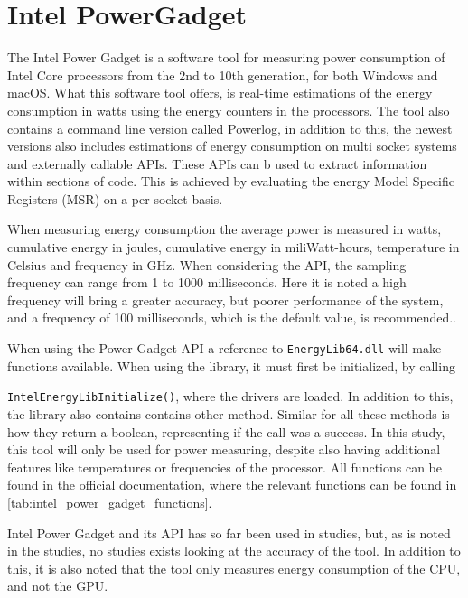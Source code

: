 \section{Intel PowerGadget}

The Intel Power Gadget\cite[]{powergadget} is a software tool for measuring power consumption of Intel Core processors from the 2nd to 10th generation, for both Windows and macOS. What this software tool offers, is real-time estimations of the energy consumption in watts using the energy counters in the processors. 
The tool also contains a command line version called Powerlog, in addition to this, the newest versions also includes estimations of energy consumption on multi socket systems and externally callable APIs. These APIs can b used to extract information within sections of code. This is achieved by evaluating the energy Model Specific Registers (MSR) on a per-socket basis.

When measuring energy consumption the average power is measured in watts, cumulative energy in joules, cumulative energy in miliWatt-hours, temperature in Celsius and frequency in GHz. When considering the API, the sampling frequency can range from 1 to 1000 milliseconds. Here it is noted a high frequency will bring a greater accuracy, but poorer performance of the system, and a frequency of 100 milliseconds, which is the default value, is recommended.\cite*[]{powergadget_api}.

When using the Power Gadget API a reference to \texttt{EnergyLib64.dll} will make functions available. When using the library, it must first be initialized, by calling 

\texttt{IntelEnergyLibInitialize()}, where the drivers are loaded. In addition to this, the library also contains contains other method. Similar for all these methods is how they return a boolean, representing if the call was a success. In this study, this tool will only be used for power measuring, despite also having additional features like temperatures or frequencies of the processor. All functions can be found in the official documentation\cite*[]{powergadget_api}, where the relevant functions can be found in \cref{tab:intel_power_gadget_functions}.

Intel Power Gadget and its API has so far been used in studies\cite[]{Bruce2015ReducingEC, Ozturk2019, Unlu2021}, but, as is noted in the studies, no studies exists looking at the accuracy of the tool. In addition to this, it is also noted that the tool only measures energy consumption of the CPU, and not the GPU.

